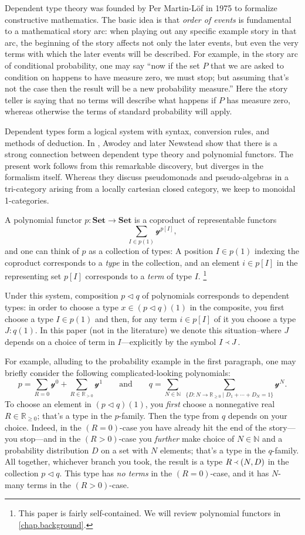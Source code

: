 \documentclass[11pt, one side, article]{memoir}
\theoremstyle{definition}
\theoremstyle{plain}
\newcommand{\Cat}[1]{\mathbf{#1}}%
\newcommand{\nn}{\mathbb{N}}
\newcommand{\rr}{\mathbb{R}}
\newcommand{\smset}{\Cat{Set}}
\newcommand{\yon}{\mathcal{y}}
\newcommand{\0}{\textsf{0}}
\newcommand{\1}{\tn{\textsf{1}}}
\newcommand{\tri}{\mathbin{\triangleleft}}
\newcommand{\founds}{\Yleft}
\newcommand{\qqand}{\qquad\text{and}\qquad}
\begin{document}
Dependent type theory \cite{martin-lof1975intuitionistic} was founded by Per Martin-L\"{o}f in 1975 to formalize constructive mathematics. The basic idea is that \emph{order of events} is fundamental to a mathematical story arc: when playing out any specific example story in that arc, the beginning of the story affects not only the later events, but even the very terms with which the later events will be described. For example, in the story arc of conditional probability, one may say ``now if the set $P$ that we are asked to condition on happens to have measure zero, we must stop; but assuming that's not the case then the result will be a new probability measure.'' Here the story teller is saying that no terms will describe what happens if $P$ has measure zero, whereas otherwise the terms of standard probability will apply.

Dependent types form a logical system with syntax, conversion rules, and methods of deduction. In \cite{awodey2014natural,awodey2018polynomial}, Awodey and later Newstead show that there is a strong connection between dependent type theory and polynomial functors. The present work follows from this remarkable discovery, but diverges in the formalism itself. Whereas they discuss pseudomonads and pseudo-algebras in a tri-category arising from a locally cartesian closed category, we keep to monoidal 1-categories. 

A polynomial functor $p\colon\smset\to\smset$ is a coproduct of representable functors
\[\sum_{I\in p(1)}\yon^{p[I]},\]
and one can think of $p$ as a collection of types: A position $I\in p(1)$ indexing the coproduct corresponds to a \emph{type} in the collection, and an element $i\in p[I]$ in the representing set $p[I]$ corresponds to a \emph{term} of type $I$.%
\footnote{This paper is fairly self-contained. We will review polynomial functors in \cref{chap.background}.}

Under this system, composition $p\tri q$ of polynomials corresponds to dependent types: in order to choose a type $x\in (p\tri q)(1)$ in the composite, you first choose a type $I\in p(1)$ and then, for any term $i\in p[I]$ of it you choose a type $J:q(1)$. In this paper (not in the literature) we denote this situation--where $J$ depends on a choice of term in $I$---explicitly by the symbol $I\founds J$. 

For example, alluding to the probability example in the first paragraph,  one may briefly consider the following complicated-looking polynomials:
\[
  p=\sum_{R=0}\yon^0+\sum_{R\in\rr_{>0}}\yon^1
  \qqand 
  q=\sum_{N\in\nn}\;\sum_{\{D\colon N\to\rr_{\geq 0}\mid D_1+\cdots+D_N=1\}}\yon^N.
\]
To choose an element in $(p\tri q)(1)$, you \emph{first} choose a nonnegative real $R\in\rr_{\geq0}$; that's a type in the $p$-family. Then the type from $q$ depends on your choice. Indeed, in the $(R=0)$-case you have already hit the end of the story---you stop---and in the $(R>0)$-case you \emph{further} make choice of $N\in\nn$ and a probability distribution $D$ on a set with $N$ elements; that's a type in the $q$-family. All together, whichever branch you took, the result is a type $R\founds(N,D)$ in the collection $p\tri q$. This type has \emph{no terms} in the $(R=0)$-case, and it has $N$-many terms in the $(R>0)$-case.
\end{document}
